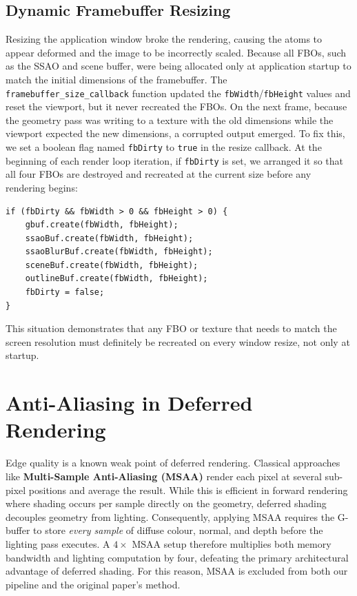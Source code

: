 \documentclass[12pt, a4paper]{article}
\begin{document}
\subsection{Dynamic Framebuffer Resizing}
Resizing the application window broke the rendering, causing the atoms to appear deformed and the image to be incorrectly scaled. Because all FBOs, such as the SSAO and scene buffer, were being allocated only at application startup to match the initial dimensions of the framebuffer. The \texttt{framebuffer\_size\_callback} function updated the \texttt{fbWidth}/\texttt{fbHeight} values and reset the viewport, but it never recreated the FBOs. On the next frame, because the geometry pass was writing to a texture with the old dimensions while the viewport expected the new dimensions, a corrupted output emerged. To fix this, we set a boolean flag named \texttt{fbDirty} to \texttt{true} in the resize callback. At the beginning of each render loop iteration, if \texttt{fbDirty} is set, we arranged it so that all four FBOs are destroyed and recreated at the current size before any rendering begins:

\begin{lstlisting}[style=cppstyle]
if (fbDirty && fbWidth > 0 && fbHeight > 0) {
    gbuf.create(fbWidth, fbHeight);
    ssaoBuf.create(fbWidth, fbHeight);
    ssaoBlurBuf.create(fbWidth, fbHeight);
    sceneBuf.create(fbWidth, fbHeight);
    outlineBuf.create(fbWidth, fbHeight);
    fbDirty = false;
}
\end{lstlisting}

This situation demonstrates that any FBO or texture that needs to match the screen resolution must definitely be recreated on every window resize, not only at startup.
\section{Anti-Aliasing in Deferred Rendering}

Edge quality is a known weak point of deferred rendering. Classical approaches like \textbf{Multi-Sample Anti-Aliasing (MSAA)} render each pixel at several sub-pixel positions and average the result. While this is efficient in forward rendering where shading occurs per sample directly on the geometry, deferred shading decouples geometry from lighting. Consequently, applying MSAA requires the G-buffer to store \emph{every sample} of diffuse colour, normal, and depth before the lighting pass executes. A $4\times$ MSAA setup therefore multiplies both memory bandwidth and lighting computation by four, defeating the primary architectural advantage of deferred shading. For this reason, MSAA is excluded from both our pipeline and the original paper's method.
\end{document}
